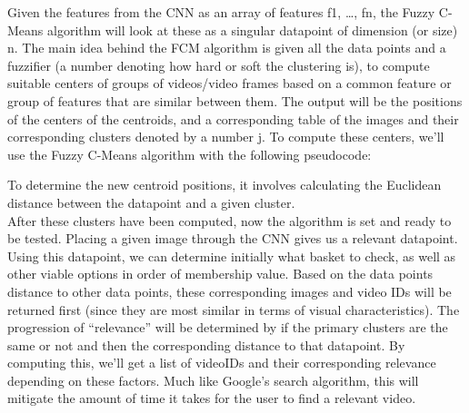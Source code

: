 \documentclass[10pt,twocolumn]{article}
\begin{document}
\indent Given the features from the CNN as an array of features {f1, …, fn}, the Fuzzy C-Means algorithm will look at these as a singular datapoint of dimension (or size) n. The main idea behind the FCM algorithm is given all the data points and a fuzzifier (a number denoting how hard or soft the clustering is), to compute suitable centers of groups of videos/video frames based on a common feature or group of features that are similar between them. The output will be the positions of the centers of the centroids, and a corresponding table of the images and their corresponding clusters denoted by a number j. To compute these centers, we’ll use the Fuzzy C-Means algorithm with the following pseudocode:

	
	

To determine the new centroid positions, it involves calculating the Euclidean distance between the datapoint and a given cluster.
\\
\indent After these clusters have been computed, now the algorithm is set and ready to be tested. Placing a given image through the CNN gives us a relevant datapoint. Using this datapoint, we can determine initially what basket to check, as well as other viable options in order of membership value. Based on the data points distance to other data points, these corresponding images and video IDs will be returned first (since they are most similar in terms of visual characteristics). The progression of “relevance” will be determined by if the primary clusters are the same or not and then the corresponding distance to that datapoint. By computing this, we’ll get a list of videoIDs and their corresponding relevance depending on these factors. Much like Google’s search algorithm, this will mitigate the amount of time it takes for the user to find a relevant video.
\end{document}
